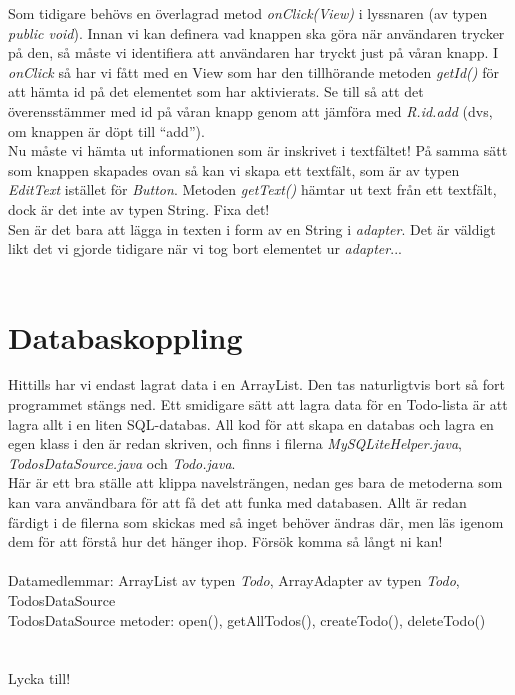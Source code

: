 \documentclass[11 pt, titlepage]{article} %
\begin{document}
Som tidigare behövs en överlagrad metod \textit{onClick(View)} i lyssnaren (av typen \textit{public void}). Innan vi kan definera vad knappen ska göra när användaren trycker på den, så måste vi identifiera att användaren har tryckt just på våran knapp.
I \textit{onClick} så har vi fått med en View som har den tillhörande metoden \textit{getId()} för att hämta id på det elementet som har aktivierats.
Se till så att det överensstämmer med id på våran knapp genom att jämföra med \textit{R.id.add} (dvs, om knappen är döpt till ``add'').\\

Nu måste vi hämta ut informationen som är inskrivet i textfältet! På samma sätt som knappen skapades ovan så kan vi skapa ett textfält, som är av typen \textit{EditText} istället för \textit{Button}.
Metoden \textit{getText()} hämtar ut text från ett textfält, dock är det inte av typen String. Fixa det!\\

Sen är det bara att lägga in texten i form av en String i \textit{adapter}. Det är väldigt likt det vi gjorde tidigare när vi tog bort elementet ur \textit{adapter}...\\ \\
\section{Databaskoppling}
Hittills har vi endast lagrat data i en ArrayList.
Den tas naturligtvis bort så fort programmet stängs ned.
Ett smidigare sätt att lagra data för en Todo-lista är att lagra allt i en liten SQL-databas.
All kod för att skapa en databas och lagra en egen klass i den är redan skriven, och finns i filerna \textit{MySQLiteHelper.java}, \textit{TodosDataSource.java} och \textit{Todo.java}.\\

Här är ett bra ställe att klippa navelsträngen, nedan ges bara de metoderna som kan vara användbara för att få det att funka med databasen.
Allt är redan färdigt i de filerna som skickas med så inget behöver ändras där, men läs igenom dem för att förstå hur det hänger ihop.
Försök komma så långt ni kan!\\ \\

Datamedlemmar: ArrayList av typen \textit{Todo}, ArrayAdapter av typen \textit{Todo}, TodosDataSource \\
TodosDataSource metoder: open(), getAllTodos(), createTodo(), deleteTodo() \\

\\ \\

Lycka till!
\end{document}
